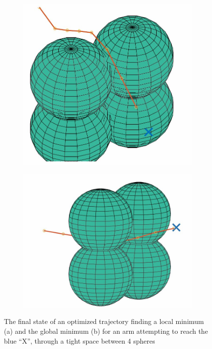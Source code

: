 \documentclass[../thesis.tex]{subfiles}
\begin{document}
\begin{figure}
  \centering
  \begin{subfigure}[b]{0.4\linewidth}
    \includegraphics[width=\linewidth]{./Planning/Local.jpg}
    \subcaption{}
  \end{subfigure}
  \begin{subfigure}[b]{0.4\linewidth}
    \includegraphics[width=\linewidth]{./Planning/global.jpg}
    \subcaption{}
  \end{subfigure}
  \caption{The final state of an optimized trajectory finding a local minimum (a) and the global minimum (b) for an arm attempting to reach the blue ``X'', through a tight space between 4 spheres}
  \label{fig:local_min}
\end{figure}
\end{document}
